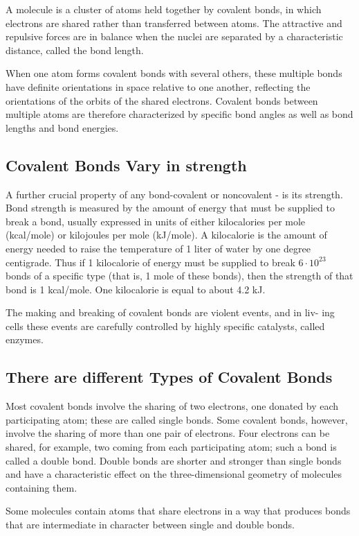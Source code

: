 A molecule is a cluster of atoms held together by covalent bonds, in which
electrons are shared rather than transferred between atoms.
The attractive and repulsive forces are in balance when the nuclei are separated
by a characteristic distance, called the bond length.

When one atom forms covalent bonds with several others, these multiple
bonds have definite orientations in space relative to one another, reflecting
the orientations of the orbits of the shared electrons. Covalent bonds
between multiple atoms are therefore characterized by specific bond
angles as well as bond lengths and bond energies.

\subsection{Covalent Bonds Vary in strength}

A further crucial property of any bond-covalent or noncovalent - is its strength. Bond
strength is measured by the amount of energy that must be supplied to
break a bond, usually expressed in units of either kilocalories per mole
(kcal/mole) or kilojoules per mole (kJ/mole). A kilocalorie is the amount
of energy needed to raise the temperature of 1 liter of water by one degree centigrade. Thus
if 1 kilocalorie of energy must be supplied to break $6 \cdot 10^{23}$ bonds of a
specific type (that is, 1 mole of these bonds), then the strength of that
bond is 1 kcal/mole. One kilocalorie is equal to about 4.2 kJ.

The making and breaking of covalent bonds are violent events, and in liv-
ing cells these events are carefully controlled by highly specific catalysts,
called enzymes.

\subsection{There are different Types of Covalent Bonds}

Most covalent bonds involve the sharing of two electrons, one donated
by each participating atom; these are called single bonds. Some covalent
bonds, however, involve the sharing of more than one pair of electrons.
Four electrons can be shared, for example, two coming from each participating
atom; such a bond is called a double bond. Double bonds are
shorter and stronger than single bonds and have a characteristic effect
on the three-dimensional geometry of molecules containing them.

Some molecules contain atoms that share electrons in a way that produces
bonds that are intermediate in character between single and double
bonds.

